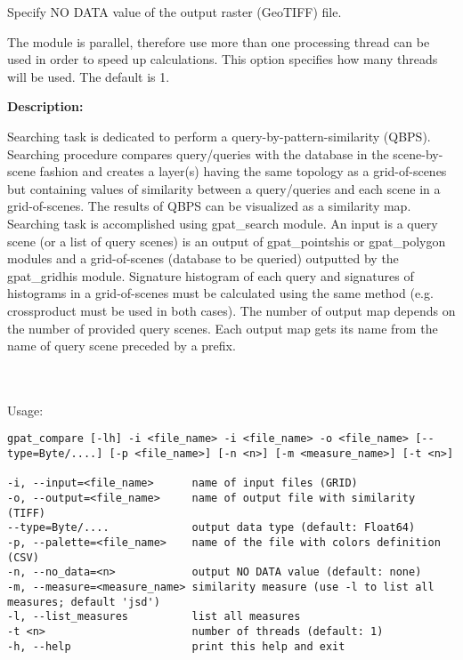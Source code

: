 
Specify NO DATA value of the output raster (GeoTIFF) file.


The module is parallel, therefore use more than one processing thread can be used in order to speed up calculations. 
This option specifies how many threads will be used. 
The default is 1.

{\bf Description:}

Searching task is dedicated to perform a query-by-pattern-similarity (QBPS). 
Searching procedure compares query/queries with the database in the scene-by-scene fashion and creates a layer(s) having the same topology as a grid-of-scenes but containing values of similarity between a query/queries and each scene in a grid-of-scenes.
The results of QBPS can be visualized as a similarity map.
Searching task is accomplished using gpat\_search module. 
An input is a query scene (or a list of query scenes) is an output of gpat\_pointshis or gpat\_polygon modules and a grid-of-scenes (database to be queried) outputted by the gpat\_gridhis module. 
Signature histogram of each query and signatures of histograms in a grid-of-scenes must be calculated using the same method (e.g. crossproduct must be used in both cases). 
The number of output map depends on the number of provided query scenes.
Each output map gets its name from the name of query scene preceded by a prefix.

{}
\\\\
Usage:

\begin{minipage}{\linewidth}
\begin{lstlisting}
gpat_compare [-lh] -i <file_name> -i <file_name> -o <file_name> [--type=Byte/....] [-p <file_name>] [-n <n>] [-m <measure_name>] [-t <n>]

-i, --input=<file_name>      name of input files (GRID)
-o, --output=<file_name>     name of output file with similarity (TIFF)
--type=Byte/....             output data type (default: Float64)
-p, --palette=<file_name>    name of the file with colors definition (CSV)
-n, --no_data=<n>            output NO DATA value (default: none)
-m, --measure=<measure_name> similarity measure (use -l to list all measures; default 'jsd')
-l, --list_measures          list all measures
-t <n>                       number of threads (default: 1)
-h, --help                   print this help and exit
\end{lstlisting}
\end{minipage}

